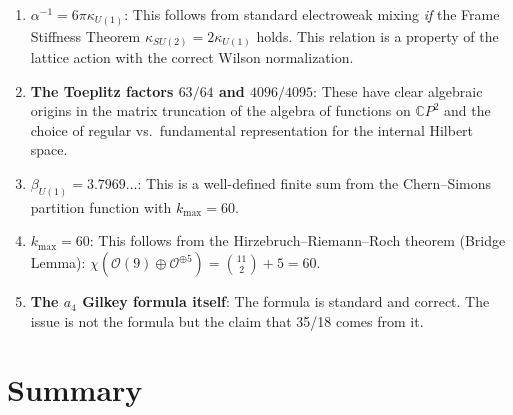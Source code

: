 \documentclass[12pt,a4paper]{article}
\theoremstyle{definition}
\begin{document}
\begin{enumerate}
\item \textbf{$\alpha^{-1} = 6\pi\kappa_{U(1)}$}: This follows from
  standard electroweak mixing \emph{if} the Frame Stiffness Theorem
  $\kappa_{SU(2)} = 2\kappa_{U(1)}$ holds.  This relation is a
  property of the lattice action with the correct Wilson normalization.

\item \textbf{The Toeplitz factors $63/64$ and $4096/4095$}: These have
  clear algebraic origins in the matrix truncation of the algebra of
  functions on $\mathbb{C}P^2$ and the choice of regular vs.\ fundamental
  representation for the internal Hilbert space.

\item \textbf{$\beta_{U(1)} = 3.7969\ldots$}: This is a well-defined
  finite sum from the Chern--Simons partition function with $k_{\max} = 60$.

\item \textbf{$k_{\max} = 60$}: This follows from the Hirzebruch--Riemann--Roch
  theorem (Bridge Lemma): $\chi(\mathcal{O}(9) \oplus \mathcal{O}^{\oplus 5})
  = \binom{11}{2} + 5 = 60$.

\item \textbf{The $a_4$ Gilkey formula itself}: The formula is standard
  and correct.  The issue is not the formula but the claim that 35/18
  comes from it.
\end{enumerate}

\section{Summary}
\label{sec:summary}
\end{document}
